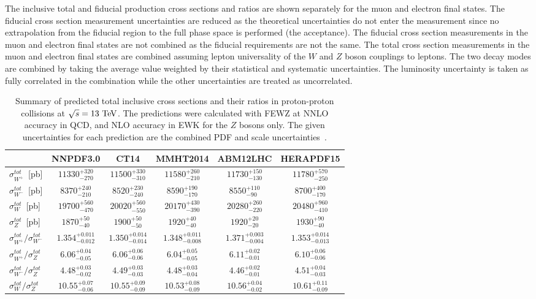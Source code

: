The inclusive total and fiducial production cross sections and ratios are shown separately for the muon and electron final states. The fiducial cross section measurement uncertainties are reduced as the theoretical uncertainties do not enter the measurement since no extrapolation from the fiducial region to the full phase space is performed (the acceptance). The fiducial cross section measurements in the muon and electron final states are not combined as the fiducial requirements are not the same. The total cross section measurements  in the muon and electron final states are combined assuming lepton universality of the $W$ and $Z$ boson couplings to leptons. The two decay modes are combined by taking the average value weighted by their statistical and systematic uncertainties. The luminosity uncertainty is taken as fully correlated in the combination while the other uncertainties are treated as uncorrelated.   
\begin{table*}[tbhp]
\centering
\begin {tabular} {lccccc}
\hline
 & \multicolumn{1}{c}{NNPDF3.0} & \multicolumn{1}{c}{CT14} & \multicolumn{1}{c}{MMHT2014} & \multicolumn{1}{c}{ABM12LHC} & \multicolumn{1}{c}{HERAPDF15} \\  \hline
$\sigma^{tot}_{W^+}$~[pb] & $11330^{+320}_{-270}$ & $11500^{+330}_{-310}$ & $11580^{+260}_{-210}$ & $11730^{+150}_{-130}$ & $11780^{+570}_{-250}$\\ 
$\sigma^{tot}_{W^-}$~[pb]  & $8370^{+240}_{-210}$ & $8520^{+230}_{-240}$ & $8590^{+190}_{-170}$ & $8550^{+110}_{-90}$ & $8700^{+400}_{-170}$\\ 
$\sigma^{tot}_{W}$~[pb]  & $19700^{+560}_{-470}$ & $20020^{+560}_{-550}$ & $20170^{+430}_{-390}$ & $20280^{+260}_{-220}$ & $20480^{+960}_{-410}$ \\ 
$\sigma^{tot}_{Z}$~[pb]  & $1870^{+50}_{-40}$ & $1900^{+50}_{-50}$ & $1920^{+40}_{-40}$ & $1920^{+20}_{-20}$ & $1930^{+90}_{-40}$ \\ 
$\sigma^{tot}_{W^+}/\sigma^{tot}_{W^-}$ & $1.354^{+0.011}_{-0.012}$ &
$1.350^{+0.014}_{-0.014}$ & $1.348^{+0.011}_{-0.008}$ &
$1.371^{+0.003}_{-0.004}$ & $1.353^{+0.014}_{-0.013}$\\
$\sigma^{tot}_{W^+}/\sigma^{tot}_{Z}$ & $6.06^{+0.04}_{-0.05}$ & $6.06^{+0.06}_{-0.06}$ & $6.04^{+0.05}_{-0.05}$ & $6.11^{+0.02}_{-0.01}$ & $6.10^{+0.06}_{-0.06}$ \\ 
$\sigma^{tot}_{W^-}/\sigma^{tot}_{Z}$ & $4.48^{+0.03}_{-0.02}$ & $4.49^{+0.03}_{-0.03}$ & $4.48^{+0.03}_{-0.04}$ & $4.46^{+0.02}_{-0.01}$ & $4.51^{+0.04}_{-0.03}$ \\ 
$\sigma^{tot}_{W}/\sigma^{tot}_{Z}$ & $10.55^{+0.07}_{-0.06}$ & $10.55^{+0.09}_{-0.09}$ & $10.53^{+0.08}_{-0.09}$ & $10.56^{+0.04}_{-0.02}$ & $10.61^{+0.11}_{-0.09}$ \\ 
\hline
\end{tabular}
\caption{ \label{tab:pdfXsec}
Summary of predicted total inclusive cross sections and their ratios in proton-proton collisions at $\sqrt{s}=13~\mathrm{Te\kern -0.1em V}$. The predictions were calculated with FEWZ at NNLO accuracy in QCD, and NLO accuracy in EWK for the $Z$ bosons only. The given uncertainties for each prediction are the combined PDF and scale uncertainties~\cite{CMS-PAS-SMP-15-004}.}
\end{table*}

